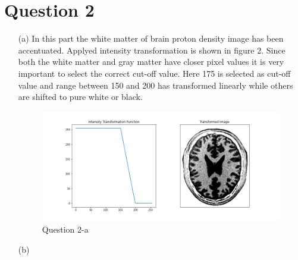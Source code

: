 \documentclass[11pt]{article}
\begin{document}
\section*{Question 2}

\begin{itemize}
    \item[(a)] In this part the white matter of brain proton density image has been accentuated. Applyed intensity transformation is
               shown in figure 2. Since both the white matter and gray matter \cite{brain} have closer pixel values it is very important to select
               the correct cut-off value. Here 175 is selected as cut-off value and range between 150 and 200 has transformed linearly
               while others are shifted to pure white or black.

                \begin{figure}[!h]
                    \centering
                    \includegraphics[width=\textwidth]{Images/2a.jpg}
                    \caption{Question 2-a}
                \end{figure} 
    
    \item[(b)]  
\end{itemize}




\end{document}
